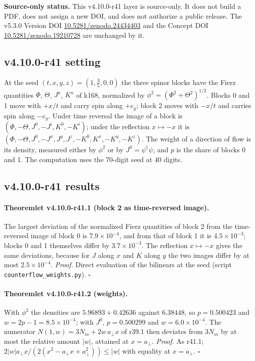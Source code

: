 \noindent\textbf{Source-only status.}
This v4.10.0-r41 layer is source-only.  It does not build a PDF, does not assign a new DOI,
and does not authorize a public release.  The v5.3.0 Version DOI
\href{https://doi.org/10.5281/zenodo.24434403}{10.5281/zenodo.24434403} and the Concept DOI
\href{https://doi.org/10.5281/zenodo.19210728}{10.5281/zenodo.19210728} are unchanged by it.

\subsection*{v4.10.0-r41 setting}
\label{subsec:v4100-r41-setting}

At the seed \((t,x,y,z)=(1,\tfrac35,0,0)\) the three spinor blocks have the Fierz quantities \(\Phi\), \(\Theta\), \(J^a\), \(K^a\) of k168, normalized by
\(\phi^2=(\Phi^2+\Theta^2)^{1/2}\).  Blocks 0 and 1 move with \(+x/t\) and carry spin along \(+e_y\); block 2 moves with \(-x/t\) and carries spin along \(-e_y\).
Under time reversal the image of a block is \((\Phi,-\Theta,J^0,-J^i,K^0,-K^i)\); under the reflection \(x\mapsto-x\) it is
\((\Phi,-\Theta,J^0,-J^x,J^y,J^z,-K^0,K^x,-K^y,-K^z)\).  The weight of a direction of flow is its density, measured either by \(\phi^2\) or by
\(J^0=\psi^\dagger\psi\), and \(p\) is the share of blocks 0 and 1.  The computation uses the 70-digit seed at 40 digits.

\subsection*{v4.10.0-r41 results}
\label{subsec:v4100-r41-results}

\paragraph{Theoremlet v4.10.0-r41.1 (block 2 as time-reversed image).}
The largest deviation of the normalized Fierz quantities of block 2 from the time-reversed image of block 0 is \(7.9\times10^{-4}\), and from that of
block 1 it is \(4.5\times10^{-3}\); blocks 0 and 1 themselves differ by \(3.7\times10^{-3}\).  The reflection \(x\mapsto-x\) gives the same deviations, because
for \(J\) along \(x\) and \(K\) along \(y\) the two images differ by at most \(2.5\times10^{-4}\).
\emph{Proof.} Direct evaluation of the bilinears at the seed (script \texttt{counterflow\_\allowbreak weights.py}).  \(\square\)

\paragraph{Theoremlet v4.10.0-r41.2 (weights).}
With \(\phi^2\) the densities are \(5.96893+0.42636\) against \(6.38448\), so \(p=0.500423\) and \(w=2p-1=8.5\times10^{-4}\); with \(J^0\), \(p=0.500299\) and
\(w=6.0\times10^{-4}\).  The numerator \(N(1,w)=3N_m+2w\,a_\perp x\) of r39.1 then deviates from \(3N_m\) by at most the relative amount \(|w|\), attained at
\(x=a_\perp\).
\emph{Proof.} As r41.1; \(2|w|a_\perp x/(2(x^2-a_\perp x+a_\perp^2))\le|w|\) with equality at \(x=a_\perp\).  \(\square\)

